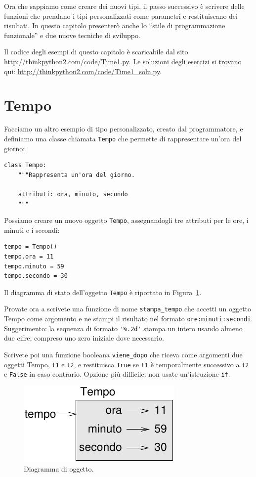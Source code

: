 \documentclass[10pt]{book}
\begin{document}
Ora che sappiamo come creare dei nuovi tipi, il passo successivo è scrivere delle funzioni che prendano i tipi personalizzati come parametri e restituiscano dei risultati. In questo capitolo presenterò anche lo ``stile di programmazione funzionale'' e due nuove tecniche di sviluppo.

Il codice degli esempi di questo capitolo è scaricabile dal sito
\url{http://thinkpython2.com/code/Time1.py}.
Le soluzioni degli esercizi si trovano qui:
\url{http://thinkpython2.com/code/Time1_soln.py}.

\section{Tempo}
\label{isafter}

Facciamo un altro esempio di tipo personalizzato, creato dal programmatore, e definiamo una classe chiamata {\tt Tempo} che permette di rappresentare un'ora del giorno:

\begin{verbatim}
class Tempo:
    """Rappresenta un'ora del giorno.
       
    attributi: ora, minuto, secondo
    """
\end{verbatim}
%
Possiamo creare un nuovo oggetto {\tt Tempo}, assegnandogli tre attributi per le
ore, i minuti e i secondi:

\begin{verbatim}
tempo = Tempo()
tempo.ora = 11
tempo.minuto = 59
tempo.secondo = 30
\end{verbatim}
%
Il diagramma di stato dell'oggetto {\tt Tempo} è riportato in Figura~\ref{fig.time}.

Provate ora a scrivete una funzione di nome \verb"stampa_tempo" che accetti un oggetto Tempo come argomento e ne stampi il risultato nel formato {\tt ore:minuti:secondi}.
Suggerimento: la sequenza di formato \verb"'%.2d'" stampa un intero usando almeno due cifre, compreso uno zero iniziale dove necessario.

Scrivete poi una funzione booleana \verb"viene_dopo" che riceva come argomenti due oggetti Tempo, {\tt t1} e {\tt t2}, e restituisca {\tt True} se {\tt t1} è temporalmente successivo a {\tt t2} e {\tt False} in caso contrario.  Opzione più difficile: non usate un'istruzione {\tt if}.


\begin{figure}
\centerline
{\includegraphics[scale=0.8]{figs/time.pdf}}
\caption{Diagramma di oggetto.}
\label{fig.time}
\end{figure}
\end{document}
